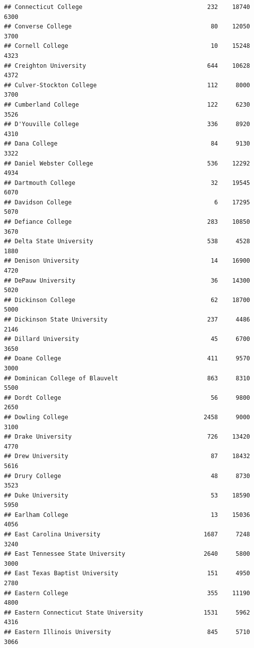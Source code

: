 \documentclass[
]{article}
\begin{document}
\begin{verbatim}
## Connecticut College                                   232    18740       6300
## Converse College                                       80    12050       3700
## Cornell College                                        10    15248       4323
## Creighton University                                  644    10628       4372
## Culver-Stockton College                               112     8000       3700
## Cumberland College                                    122     6230       3526
## D'Youville College                                    336     8920       4310
## Dana College                                           84     9130       3322
## Daniel Webster College                                536    12292       4934
## Dartmouth College                                      32    19545       6070
## Davidson College                                        6    17295       5070
## Defiance College                                      283    10850       3670
## Delta State University                                538     4528       1880
## Denison University                                     14    16900       4720
## DePauw University                                      36    14300       5020
## Dickinson College                                      62    18700       5000
## Dickinson State University                            237     4486       2146
## Dillard University                                     45     6700       3650
## Doane College                                         411     9570       3000
## Dominican College of Blauvelt                         863     8310       5500
## Dordt College                                          56     9800       2650
## Dowling College                                      2458     9000       3100
## Drake University                                      726    13420       4770
## Drew University                                        87    18432       5616
## Drury College                                          48     8730       3523
## Duke University                                        53    18590       5950
## Earlham College                                        13    15036       4056
## East Carolina University                             1687     7248       3240
## East Tennessee State University                      2640     5800       3000
## East Texas Baptist University                         151     4950       2780
## Eastern College                                       355    11190       4800
## Eastern Connecticut State University                 1531     5962       4316
## Eastern Illinois University                           845     5710       3066

\end{verbatim}
\end{document}

